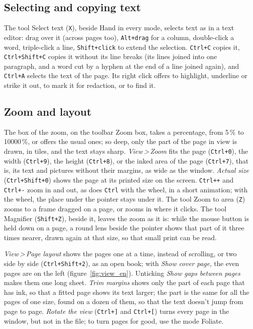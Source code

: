 \documentclass[12pt,
              article,
              oneside
              ]{memoir}
\newcommand*{\menu}[1]{\textit{#1}}
\newcommand*{\then}{\,>\,}
\newcommand*{\key}[1]{\texttt{#1}}
\begin{document}
\subsection{Selecting and copying text}

%
The tool Select text (\key{X}), beside Hand in every mode, selects text as
in a text editor: drag over it (across pages too), \key{Alt+drag} for a
column, double-click a word, triple-click a line, \key{Shift+click} to
extend the selection. \key{Ctrl+C} copies it, \key{Ctrl+Shift+C} copies it
without its line breaks (its lines joined into one paragraph, and a word
cut by a hyphen at the end of a line joined again), and \key{Ctrl+A}
selects the text of the page. Its right click offers to highlight, underline or strike
it out, to mark it for redaction, or to find it.

\subsection{Zoom and layout}

%
The box of the zoom, on the toolbar Zoom box, takes a percentage, from 5\,\% to
10000\,\%, or offers the usual ones; so deep, only the part of the page in
view is drawn, in tiles, and the text stays sharp. \menu{View\then Zoom} fits the page (\key{Ctrl+0}), the width
(\key{Ctrl+9}), the height (\key{Ctrl+8}), or the inked area of the page
(\key{Ctrl+7}), that is, its text and pictures without their margins, as
wide as the window. \menu{Actual size} (\key{Ctrl+Shift+0}) shows the page
at its printed size on the screen. \key{Ctrl++} and \key{Ctrl+-} zoom in and
out, as does \key{Ctrl} with the wheel, in a short animation; with the
wheel, the place under the pointer stays under it. The tool Zoom to area (\key{Z})
zooms to a frame dragged on a page, or zooms in where it clicks. The tool
Magnifier (\key{Shift+Z}), beside it, leaves the zoom as it is: while the
mouse button is held down on a page, a round lens beside the pointer shows
that part of it three times nearer, drawn again at that size, so that
small print can be read.

%
\menu{View\then Page layout} shows the pages one at a time, instead of
scrolling, or two side by side (\key{Ctrl+Shift+2}), as an open book; with
\menu{Show cover page}, the even pages are on the left
(figure~\ref{fig:view_en}). Unticking \menu{Show gaps between pages} makes
them one long sheet. \menu{Trim margins} shows only the part of each page
that has ink, so that a fitted page shows its text larger; the part is the
same for all the pages of one size, found on a dozen of them, so that the
text doesn't jump from page to page. \menu{Rotate the view} (\key{Ctrl+]} and \key{Ctrl+[})
turns every page in the window, but not in the file; to turn pages for
good, use the mode Foliate.
\end{document}

